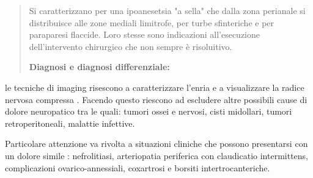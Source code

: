 \documentclass[]{article}
\begin{document}
\begin{quote}
Si caratterizzano per una ipoanesetsia "a sella" che dalla zona
perianale si distribuisce alle zone mediali limitrofe, per turbe
sfinteriche e per paraparesi flaccide. Loro stesse sono indicazioni
all'esecuzione dell'intervento chirurgico che non sempre è risoluitivo.

\textbf{Diagnosi e diagnosi differenziale:}
\end{quote}

le tecniche di imaging risescono a caratterizzare l'enria e a
visualizzare la radice nervosa compressa . Facendo questo riescono ad
escludere altre possibili cause di dolore neuropatico tra le quali:
tumori ossei e nervosi, cisti midollari, tumori retroperitoneali,
malattie infettive.

Particolare attenzione va rivolta a situazioni cliniche che possono
presentarsi con un dolore simile : nefrolitiasi, arteriopatia periferica
con claudicatio intermittens, complicazioni ovarico-annessiali,
coxartrosi e borsiti intertrocanteriche.
\end{document}
